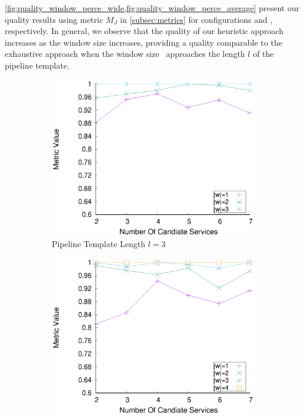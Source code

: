     {\color{OurColor2}\cref{fig:quality_window_perce_wide,fig:quality_window_perce_average} present} our quality results using metric $M_J$ in \cref{subsec:metrics} for configurations \wide and \average, respectively.
    In general, we observe that the quality of our heuristic approach increases as the window size increases, providing a quality comparable to the exhaustive approach when the window size \windowsize\ approaches the length $l$ of the pipeline template.
    \begin{figure}[ht!]
      \centering
      \begin{subfigure}{0.49\textwidth}
        \includegraphics[width=\textwidth]{Images/graphs/window_quality_performance_diff_perce_n7_s7_20_100_n3}
        \caption{Pipeline Template Length $l$$=$3}
        \label{fig:quality_window_wide_perce_n3}
      \end{subfigure}
      \hfill
      \begin{subfigure}{0.49\textwidth}
        \includegraphics[width=\textwidth]{Images/graphs/window_quality_performance_diff_perce_n7_s7_20_100_n4}

\end{subfigure}
\end{figure}
